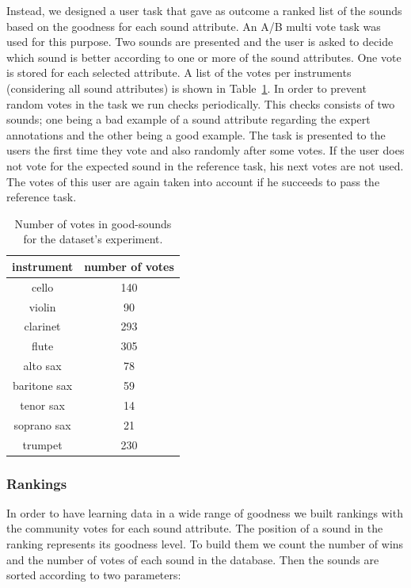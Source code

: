 \documentclass{article}
\begin{document}
Instead, we designed a user task that gave as outcome a ranked list of the sounds based on the goodness for each sound attribute. An A/B multi vote task was used for this purpose. Two sounds are presented and the user is asked to decide which sound is better according to one or more of the sound attributes. One vote is stored for each selected attribute. A list of the votes per instruments (considering all sound attributes) is shown in Table~\ref{votes}.
In order to prevent random votes in the task we run checks periodically. This checks consists of two sounds; one being a bad example of a sound attribute regarding the expert annotations and the other being a good example. The task is presented to the users the first time they vote and also randomly after some votes. If the user does not vote for the expected sound in the reference task, his next votes are not used. The votes of this user are again taken into account if he succeeds to pass the reference task. 


\begin{table}[ht]
\centering
\begin{tabular}{cc}
\hline
instrument   & number of votes \\ \hline
cello        & 140             \\
violin       & 90              \\
clarinet     & 293             \\
flute        & 305             \\
alto sax     & 78              \\
baritone sax & 59              \\
tenor sax    & 14              \\
soprano sax  & 21              \\
trumpet      & 230             \\ \hline
\end{tabular}
\caption{Number of votes in good-sounds for the dataset's experiment.}
\label{votes}
\end{table}

\subsubsection{Rankings}
In order to have learning data in a wide range of goodness we built rankings with the community votes for each sound attribute. The position of a sound in the ranking represents its goodness level. To build them we count the number of wins and the number of votes of each sound in the database. Then the sounds are sorted according to two parameters: 
\end{document}

